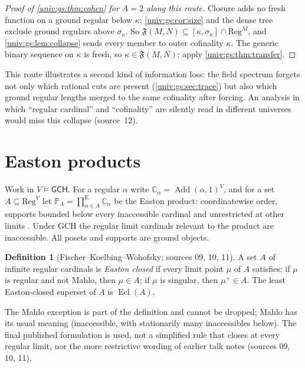 \documentclass[11pt,letterpaper]{article}
\numberwithin{equation}{section}
\theoremstyle{definition}
\newtheorem{definition}[definition]{Definition}
\theoremstyle{remark}
\newcommand{\Add}{\operatorname{Add}}
\newcommand{\FF}{\mathfrak F}
\newcommand{\Reg}{\mathrm{Reg}}
\newcommand{\Ecl}{\operatorname{Ecl}}
\newcommand{\GCH}{\mathsf{GCH}}
\begin{document}
\begin{proof}[Proof of \cref{univ:gs:thm:cohen} for $A=2$ along this route]
Closure adds no fresh function on a ground regular below $\kappa$;
\cref{univ:gs:cor:size} and the dense tree exclude ground regulars above
$\sigma_\kappa$. So $\FF(M,N)\subseteq[\kappa,\sigma_\kappa]\cap\Reg^M$, and
\cref{univ:gs:lem:collapse} sends every member to outer cofinality $\kappa$. The
generic binary sequence on $\kappa$ is fresh, so $\kappa\in\FF(M,N)$; apply
\cref{univ:gs:thm:transfer}.
\end{proof}

This route illustrates a second kind of information loss: the field spectrum
forgets not only which rational cuts are present (\cref{univ:gs:sec:trace}) but also
which ground regular lengths merged to the same cofinality after forcing. An analysis
in which ``regular cardinal'' and ``cofinality'' are silently read in different
universes would miss this collapse (source~12).

\section{Easton products}\label{univ:gs:sec:easton}

Work in $V\models\GCH$. For a regular $\alpha$ write $\mathbb C_\alpha=\Add(\alpha,1)^V$,
and for a set $A\subseteq\Reg^V$ let $\mathbb P_A=\prod^{\mathrm E}_{\alpha\in A}\mathbb
C_\alpha$ be the Easton product: coordinatewise order, supports bounded below every
inaccessible cardinal and unrestricted at other limits \cite[Definition~4.7]{FKW}. Under
GCH the regular limit cardinals relevant to the product are inaccessible. All posets
and supports are ground objects.

\begin{definition}[Fischer--Koelbing--Wohofsky; sources 09, 10, 11]\label{univ:gs:def:easton}
A set $A$ of infinite regular cardinals is \emph{Easton closed} if every limit point
$\mu$ of $A$ satisfies: if $\mu$ is regular and not Mahlo, then $\mu\in A$; if $\mu$ is
singular, then $\mu^+\in A$. The least Easton-closed superset of $A$ is $\Ecl(A)$.
\end{definition}

The Mahlo exception is part of the definition and cannot be dropped; Mahlo has its
usual meaning (inaccessible, with stationarily many inaccessibles below). The final
published formulation is used, not a simplified rule that closes at every regular
limit, nor the more restrictive wording of earlier talk notes (sources 09, 10, 11).
\end{document}
